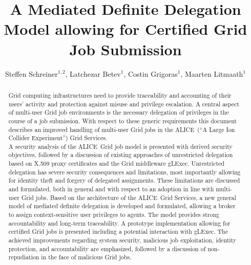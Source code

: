 \documentclass[10pt]{iopart}
\newcommand{\alice}{ALICE}
\newcommand{\alicee}{A Large Ion Collider Experiment}
\begin{document}
\title{A Mediated Definite Delegation Model allowing for Certified Grid Job Submission}


	\author{Steffen Schreiner$^1$$^,$$^2$, Latchezar Betev$^1$, Costin
Grigoras$^1$, Maarten Litmaath$^1$}
	\address{$^1$ European Organization for Nuclear Research CERN, Geneva,
	Switzerland}
	\address{$^2$ Center for Advanced Security Research Darmstadt - CASED\\~~~and
	Technische Universit\"{a}t Darmstadt, Germany}








\begin{abstract}
Grid computing infrastructures need to provide
traceability and accounting of their users' activity and
protection against misuse and privilege escalation.
A central aspect of multi-user Grid job environments is
the necessary delegation of privileges in the course of a job submission. 
With respect to these generic requirements
this document describes an improved handling of multi-user
Grid jobs in the \alice\ (``\alicee'') Grid Services.\\
A security analysis of the \alice\ Grid
job model is presented with derived security objectives, followed by a
discussion of existing approaches of unrestricted delegation based on X.509
proxy certificates and the Grid middleware gLExec. Unrestricted
delegation has severe security consequences and limitations,
most importantly allowing for identity theft and forgery of delegated assignments.
These limitations are discussed and formulated, both in general and with respect
to an adoption in line with multi-user Grid jobs. Based on the architecture of
the \alice\ Grid Services, a new general model of mediated definite delegation is
developed and formulated, allowing a broker to assign context-sensitive user
privileges to agents. The model provides strong accountability and long-term 
traceability. A prototype implementation allowing for certified Grid jobs is
presented including a potential interaction with gLExec. The achieved 
improvements regarding system security, malicious job exploitation, identity
protection, and accountability are emphasized, followed by a
discussion of non-repudiation in the face of malicious Grid jobs.
\end{abstract}
\end{document}
